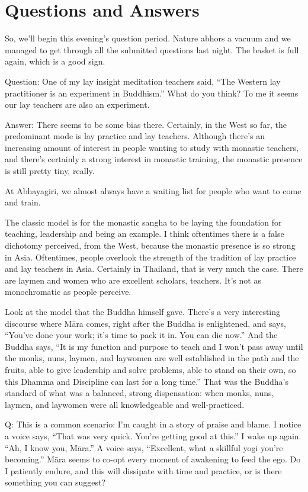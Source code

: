 \chapter{Questions and Answers}

So, we’ll begin this evening’s question period. Nature abhors a vacuum
and we managed to get through all the submitted questions last night.
The basket is full again, which is a good sign.

\qaspace
Question: One of my lay insight meditation teachers said, “The Western
lay practitioner is an experiment in Buddhism.” What do you think? To me
it seems our lay teachers are also an experiment.

\qaspace
Answer: There seems to be some bias there. Certainly, in the West so
far, the predominant mode is lay practice and lay teachers. Although
there’s an increasing amount of interest in people wanting to study with
monastic teachers, and there’s certainly a strong interest in monastic
training, the monastic presence is still pretty tiny, really.

At Abhayagiri, we almost always have a waiting list for people who want
to come and train.

The classic model is for the monastic sangha to be laying the foundation
for teaching, leadership and being an example. I think oftentimes there
is a false dichotomy perceived, from the West, because the monastic
presence is so strong in Asia. Oftentimes, people overlook the strength
of the tradition of lay practice and lay teachers in Asia. Certainly in
Thailand, that is very much the case. There are laymen and women who are
excellent scholars, teachers. It’s not as monochromatic as people
perceive.

Look at the model that the Buddha himself gave. There’s a very
interesting discourse where Māra comes, right after the Buddha is
enlightened, and says, “You’ve done your work; it's time to pack it in.
You can die now.” And the Buddha says, “It is my function and purpose to
teach and I won’t pass away until the monks, nuns, laymen, and laywomen
are well established in the path and the fruits, able to give leadership
and solve problems, able to stand on their own, so this Dhamma and
Discipline can last for a long time.” That was the Buddha’s standard of
what was a balanced, strong dispensation: when monks, nuns, laymen, and
laywomen were all knowledgeable and well-practiced.

\qaspace
Q: This is a common scenario: I’m caught in a story of praise and blame.
I notice a voice says, “That was very quick. You’re getting good at
this.” I wake up again. “Ah, I know you, Māra.” A voice says,
“Excellent, what a skillful yogi you’re becoming.” Māra seems to co-opt
every moment of awakening to feed the ego. Do I patiently endure, and
this will dissipate with time and practice, or is there something you
can suggest?

